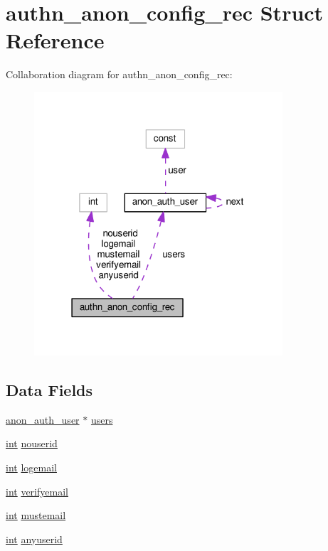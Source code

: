 \hypertarget{structauthn__anon__config__rec}{}\section{authn\+\_\+anon\+\_\+config\+\_\+rec Struct Reference}
\label{structauthn__anon__config__rec}


Collaboration diagram for authn\+\_\+anon\+\_\+config\+\_\+rec\+:
\nopagebreak
\begin{figure}[H]
\begin{center}
\leavevmode
\includegraphics[width=262pt]{structauthn__anon__config__rec__coll__graph}
\end{center}
\end{figure}
\subsection*{Data Fields}
\begin{DoxyCompactItemize}
\item 
\hyperlink{structanon__auth__user}{anon\+\_\+auth\+\_\+user} $\ast$ \hyperlink{structauthn__anon__config__rec_a0e299393b6d41b73088657ebb22888c7}{users}
\item 
\hyperlink{pcre_8txt_a42dfa4ff673c82d8efe7144098fbc198}{int} \hyperlink{structauthn__anon__config__rec_aa7b5fcadc5bc34695a6b58400ebd2080}{nouserid}
\item 
\hyperlink{pcre_8txt_a42dfa4ff673c82d8efe7144098fbc198}{int} \hyperlink{structauthn__anon__config__rec_a22a097ad0eb1315327f44d8261a9ec5b}{logemail}
\item 
\hyperlink{pcre_8txt_a42dfa4ff673c82d8efe7144098fbc198}{int} \hyperlink{structauthn__anon__config__rec_a22896716e371a7a18b26755e583acef9}{verifyemail}
\item 
\hyperlink{pcre_8txt_a42dfa4ff673c82d8efe7144098fbc198}{int} \hyperlink{structauthn__anon__config__rec_a75a2d6a0c7b66fa05b48bf0c8890981b}{mustemail}
\item 
\hyperlink{pcre_8txt_a42dfa4ff673c82d8efe7144098fbc198}{int} \hyperlink{structauthn__anon__config__rec_af1d32e252c1cea88e7b193043023d773}{anyuserid}
\end{DoxyCompactItemize}


